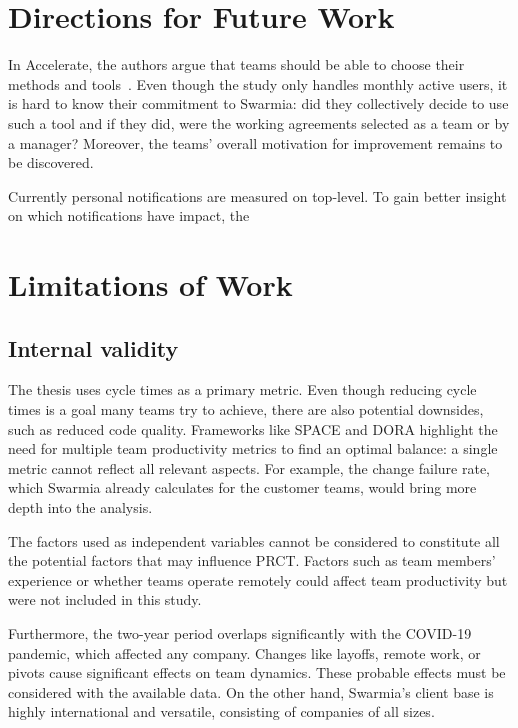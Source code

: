 \section{Directions for Future Work}

In Accelerate, the authors argue that teams should be able to choose their methods and tools~\cite{forsgren_accelerate_2018}. Even though the study only handles monthly active users, it is hard to know their commitment to Swarmia: did they collectively decide to use such a tool and if they did, were the working agreements selected as a team or by a manager? Moreover, the teams' overall motivation for improvement remains to be discovered.

Currently personal notifications are measured on top-level. To gain better insight on which notifications have impact, the 



\section{Limitations of Work}

\subsection{Internal validity}

The thesis uses cycle times as a primary metric. Even though reducing cycle times is a goal many teams try to achieve, there are also potential downsides, such as reduced code quality. Frameworks like SPACE and DORA highlight the need for multiple team productivity metrics to find an optimal balance: a single metric cannot reflect all relevant aspects. For example, the change failure rate, which Swarmia already calculates for the customer teams, would bring more depth into the analysis. 

The factors used as independent variables cannot be considered to constitute all the potential factors that may influence PRCT. Factors such as team members' experience or whether teams operate remotely could affect team productivity but were not included in this study. 

Furthermore, the two-year period overlaps significantly with the COVID-19 pandemic, which affected any company. Changes like layoffs, remote work, or pivots cause significant effects on team dynamics. These probable effects must be considered with the available data. On the other hand, Swarmia's client base is highly international and versatile, consisting of companies of all sizes. 

